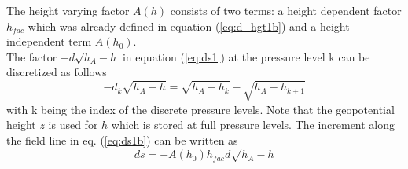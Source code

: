 %
The height varying factor $A(h)$ consists of two terms:
a height dependent factor $h_{fac}$ which was already defined in equation (\ref{eq:d_hgt1b}) and
a height independent term $A(h_0)$. \\
%
The factor $- d \sqrt{h_A-h}$ in equation (\ref{eq:ds1}) at the pressure level k
 can be discretized as follows
%
\begin{equation}
 - d_k \sqrt{h_A-h} = \sqrt{h_A - h_{k}} - \sqrt{h_A - h_{k+1}}   \label{eq:ds8}
\end{equation}
%
with k being the index of the discrete pressure levels. Note that the geopotential height $z$
is used for $h$ which is stored at full pressure levels. 
The increment along the field line in eq. (\ref{eq:ds1b}) can be written as 
%
\begin{equation}
   ds  = - A(h_0) h_{fac} d \sqrt{h_A-h} \label{eq:ds9}
\end{equation}
%
%
